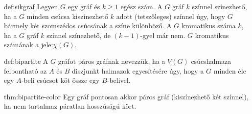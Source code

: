 \begin{definition}{def:sikgraf}
	Legyen $G$ egy gráf és $k\geq1$ egész szám.
	A $G$ gráf $k$ színnel színezhető, ha a $G$ minden csúcsa kiszínezhető
	$k$ adott (tetszőleges) színnel úgy, hogy $G$ bármely két szomszédos
	csúcsának a színe különböző. A $G$ kromatikus száma $k$, ha a $G$
	gráf $k$ színnel színezhető, de $(k-1)$-gyel már nem. $G$ kromatikus
	számának a jele:$\chi(G)$.
\end{definition}
\begin{definition}{def:bipartite}
	A $G$ gráfot páros gráfnak nevezzük, ha a $V(G)$
	csúcshalmaza felbontható az $A$ és $B$ diszjunkt halmazok egyesítésére
	úgy, hogy a $G$ minden éle egy $A$-beli csúcsot köt össze egy $B$-belivel.
\end{definition}
\begin{theorem}{thm:bipartite-color}
	Egy gráf pontosan akkor páros gráf (kiszínezhető két színnel), ha
	nem tartalmaz páratlan hosszúságú kört. 
\end{theorem}
